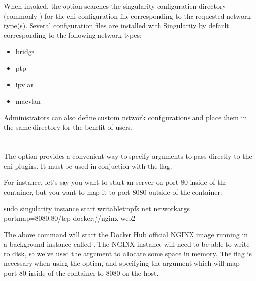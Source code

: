 \documentclass[letterpaper,10pt,english]{sphinxmanual}
\begin{document}
When invoked, the  option searches the singularity configuration
directory (commonly ) for the cni
configuration file corresponding to the requested network type(s). Several
configuration files are installed with Singularity by default corresponding to
the following network types:
\begin{itemize}
\item {} 
bridge

\item {} 
ptp

\item {} 
ipvlan

\item {} 
macvlan

\end{itemize}

Administrators can also define custom network configurations and place them in
the same directory for the benefit of users.


\section{}
\label{\detokenize{networking:network-args}}
The  option provides a convenient way to specify arguments to
pass directly to the cni plugins.  It must be used in conjuction with the
 flag.

For instance, let’s say you want to start an 
server on port 80 inside of the container, but you want to map it to port 8080
outside of the container:

%
\begin{sphinxVerbatim}[commandchars=\\\{\}]
\PYGZdl{} sudo singularity instance start \PYGZhy{}\PYGZhy{}writable\PYGZhy{}tmpfs \PYGZbs{}
    \PYGZhy{}\PYGZhy{}net \PYGZhy{}\PYGZhy{}network\PYGZhy{}args \PYGZdq{}portmap=8080:80/tcp\PYGZdq{} docker://nginx web2
\end{sphinxVerbatim}

The above command will start the Docker Hub official NGINX image running in a
background instance called .  The NGINX instance will need to be able to
write to disk, so we’ve used the  argument to allocate some
space in memory.  The  flag is necessary when using the
 option, and specifying the  argument
which will map port 80 inside of the container to 8080 on the host.
\end{document}
